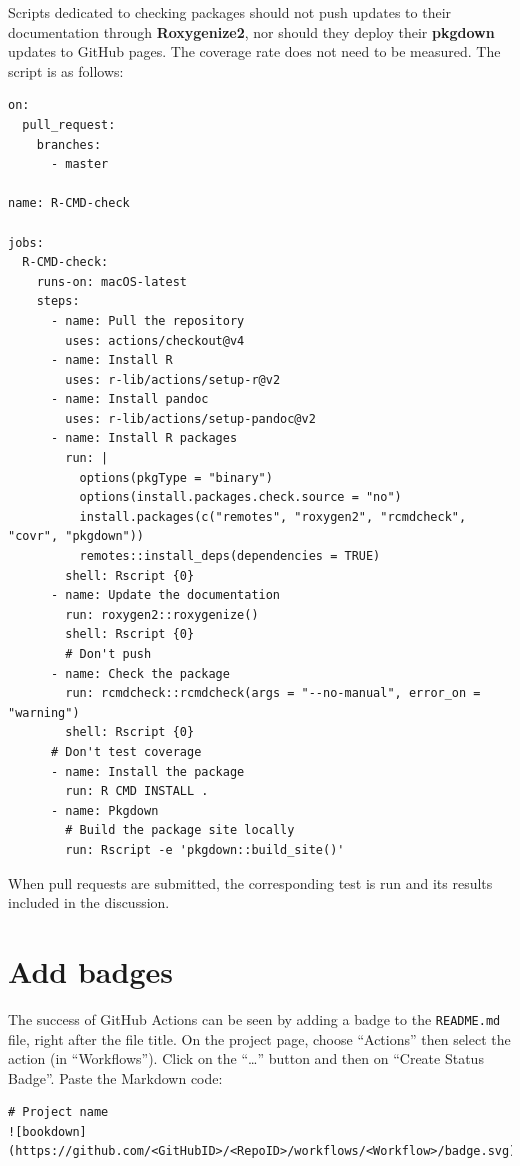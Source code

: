 \documentclass[
  12pt,
  american,
  a4paper,
  extrafontsizes,onecolumn,openright
  ]{memoir}
\begin{document}
Scripts dedicated to checking packages should not push updates to their documentation through \textbf{Roxygenize2}, nor should they deploy their \textbf{pkgdown} updates to GitHub pages.
The coverage rate does not need to be measured.
The script is as follows:

\begin{verbatim}
on:
  pull_request:
    branches:
      - master

name: R-CMD-check

jobs:
  R-CMD-check:
    runs-on: macOS-latest
    steps:
      - name: Pull the repository
        uses: actions/checkout@v4
      - name: Install R
        uses: r-lib/actions/setup-r@v2
      - name: Install pandoc
        uses: r-lib/actions/setup-pandoc@v2
      - name: Install R packages
        run: |
          options(pkgType = "binary")
          options(install.packages.check.source = "no")
          install.packages(c("remotes", "roxygen2", "rcmdcheck", "covr", "pkgdown"))
          remotes::install_deps(dependencies = TRUE)
        shell: Rscript {0}
      - name: Update the documentation
        run: roxygen2::roxygenize()
        shell: Rscript {0}
        # Don't push
      - name: Check the package
        run: rcmdcheck::rcmdcheck(args = "--no-manual", error_on = "warning")
        shell: Rscript {0}
      # Don't test coverage
      - name: Install the package
        run: R CMD INSTALL .
      - name: Pkgdown
        # Build the package site locally
        run: Rscript -e 'pkgdown::build_site()'
\end{verbatim}

When pull requests are submitted, the corresponding test is run and its results included in the discussion.

\section{Add badges}\label{sec:ci-badges}

The success of GitHub Actions can be seen by adding a badge to the \texttt{README.md} file, right after the file title.
On the project page, choose \enquote{Actions} then select the action (in \enquote{Workflows}).
Click on the \enquote{\ldots{}} button and then on \enquote{Create Status Badge}.
Paste the Markdown code:

\begin{verbatim}
# Project name
![bookdown](https://github.com/<GitHubID>/<RepoID>/workflows/<Workflow>/badge.svg)
\end{verbatim}
\end{document}
